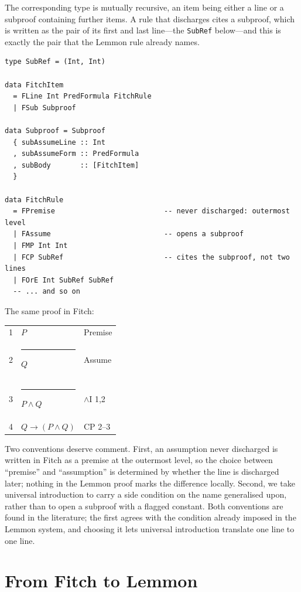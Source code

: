 \documentclass[11pt]{article}
\makeatletter
\theoremstyle{plain}
\theoremstyle{definition}
\theoremstyle{remark}
\newcommand{\fbar}{\rule[-0.7ex]{0.4pt}{2.6ex}\hspace{0.7em}}
\newenvironment{fitchproof}
  {\begin{center}\begin{tabular}{@{}r@{\hspace{1em}}l@{\hspace{2.5em}}l@{}}}
  {\end{tabular}\end{center}}
\makeatother
\begin{document}
The corresponding type is mutually recursive, an item being either a line or
a subproof containing further items. A rule that discharges cites a subproof,
which is written as the pair of its first and last line---the \verb|SubRef|
below---and this is exactly the pair that the Lemmon rule already names.

\begin{lstlisting}
type SubRef = (Int, Int)

data FitchItem
  = FLine Int PredFormula FitchRule
  | FSub Subproof

data Subproof = Subproof
  { subAssumeLine :: Int
  , subAssumeForm :: PredFormula
  , subBody       :: [FitchItem]
  }

data FitchRule
  = FPremise                          -- never discharged: outermost level
  | FAssume                           -- opens a subproof
  | FMP Int Int
  | FCP SubRef                        -- cites the subproof, not two lines
  | FOrE Int SubRef SubRef
  -- ... and so on
\end{lstlisting}

The same proof in Fitch:

\begin{fitchproof}
1 &                 $P$                  & Premise \\
2 & \fbar           $Q$                  & Assume \\
3 & \fbar           $P \wedge Q$         & $\wedge$I 1,2 \\
4 &                 $Q \to (P \wedge Q)$ & CP 2--3 \\
\end{fitchproof}

Two conventions deserve comment. First, an assumption never discharged is
written in Fitch as a premise at the outermost level, so the choice between
``premise'' and ``assumption'' is determined by whether the line is discharged
later; nothing in the Lemmon proof marks the difference locally. Second, we
take universal introduction to carry a side condition on the name generalised
upon, rather than to open a subproof with a flagged constant. Both conventions
are found in the literature; the first agrees with the condition already
imposed in the Lemmon system, and choosing it lets universal introduction
translate one line to one line.

\section{From Fitch to Lemmon}\label{sec:fitch-to-lemmon}
\end{document}
